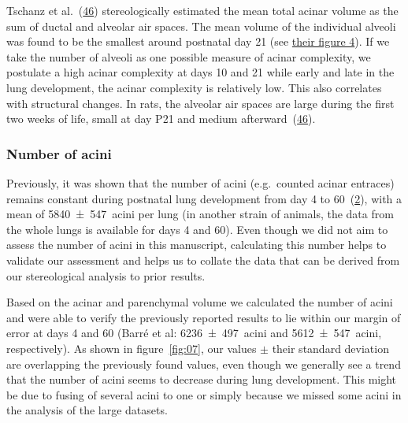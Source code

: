 \documentclass[
  american,
]{article}
\begin{document}
Tschanz et al.~(\protect\hyperlink{ref-wnl86DEM}{46}) stereologically estimated the mean total acinar volume as the sum of ductal and alveolar air spaces.
The mean volume of the individual alveoli was found to be the smallest around postnatal day 21 (see \href{https://www.physiology.org/na101/home/literatum/publisher/physio/journals/content/jappl/2014/jappl.2014.117.issue-1/japplphysiol.01355.2013/production/images/medium/zdg0121410620004.jpeg}{their figure 4}).
If we take the number of alveoli as one possible measure of acinar complexity, we postulate a high acinar complexity at days 10 and 21 while early and late in the lung development, the acinar complexity is relatively low.
This also correlates with structural changes.
In rats, the alveolar air spaces are large during the first two weeks of life, small at day P21 and medium afterward~(\protect\hyperlink{ref-wnl86DEM}{46}).

\hypertarget{number-of-acini-1}{%
\subsubsection{Number of acini}\label{number-of-acini-1}}

Previously, it was shown that the number of acini (e.g.~counted acinar entraces) remains constant during postnatal lung development from day 4 to 60~(\protect\hyperlink{ref-14OP85b2F}{2}), with a mean of 5840~±~547~acini per lung (in another strain of animals, the data from the whole lungs is available for days 4 and 60).
Even though we did not aim to assess the number of acini in this manuscript, calculating this number helps to validate our assessment and helps us to collate the data that can be derived from our stereological analysis to prior results.

Based on the acinar and parenchymal volume we calculated the number of acini and were able to verify the previously reported results to lie within our margin of error at days 4 and 60 (Barré et al: 6236~±~497~acini and 5612~±~547~acini, respectively).
As shown in figure~\ref{fig:07}, our values \(\pm\) their standard deviation are overlapping the previously found values, even though we generally see a trend that the number of acini seems to decrease during lung development.
This might be due to fusing of several acini to one or simply because we missed some acini in the analysis of the large datasets.
\end{document}
